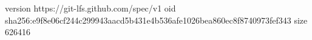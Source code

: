 version https://git-lfs.github.com/spec/v1
oid sha256:e9f8e06cf244c299943aacd5b431e4b536afe1026bea860ec8f8740973fef343
size 626416
